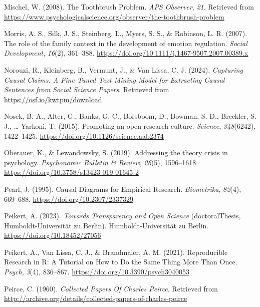 \documentclass[
  man, noextraspace,floatsintext]{apa6}
\newlength{\cslhangindent}
\newenvironment{CSLReferences}[2] %
 {\begin{list}{}{%
  \setlength{\itemindent}{0pt}
  \setlength{\leftmargin}{0pt}
  \setlength{\parsep}{0pt}
  \ifodd #1
   \setlength{\leftmargin}{\cslhangindent}
   \setlength{\itemindent}{-1\cslhangindent}
  \fi
  \setlength{\itemsep}{#2\baselineskip}}}
 {\end{list}}
\begin{document}
\begin{CSLReferences}{1}{0}
Mischel, W. (2008). The {Toothbrush Problem}. \emph{APS Observer}, \emph{21}. Retrieved from \url{https://www.psychologicalscience.org/observer/the-toothbrush-problem}

Morris, A. S., Silk, J. S., Steinberg, L., Myers, S. S., \& Robinson, L. R. (2007). The role of the family context in the development of emotion regulation. \emph{Social Development}, \emph{16}(2), 361--388. \url{https://doi.org/10.1111/j.1467-9507.2007.00389.x}

Norouzi, R., Kleinberg, B., Vermunt, J., \& Van Lissa, C. J. (2024). \emph{Capturing {Causal Claims}: {A Fine Tuned Text Mining Model} for {Extracting Causal Sentences} from {Social Science Papers}}. Retrieved from \url{https://osf.io/kwtpm/download}

Nosek, B. A., Alter, G., Banks, G. C., Borsboom, D., Bowman, S. D., Breckler, S. J., \ldots{} Yarkoni, T. (2015). Promoting an open research culture. \emph{Science}, \emph{348}(6242), 1422--1425. \url{https://doi.org/10.1126/science.aab2374}

Oberauer, K., \& Lewandowsky, S. (2019). Addressing the theory crisis in psychology. \emph{Psychonomic Bulletin \& Review}, \emph{26}(5), 1596--1618. \url{https://doi.org/10.3758/s13423-019-01645-2}

Pearl, J. (1995). Causal {Diagrams} for {Empirical Research}. \emph{Biometrika}, \emph{82}(4), 669--688. \url{https://doi.org/10.2307/2337329}

Peikert, A. (2023). \emph{Towards {Transparency} and {Open Science}} (doctoralThesis, Humboldt-Universität zu Berlin). Humboldt-Universität zu Berlin. \url{https://doi.org/10.18452/27056}

Peikert, A., Van Lissa, C. J., \& Brandmaier, A. M. (2021). Reproducible {Research} in {R}: {A Tutorial} on {How} to {Do} the {Same Thing More Than Once}. \emph{Psych}, \emph{3}(4), 836--867. \url{https://doi.org/10.3390/psych3040053}

Peirce, C. (1960). \emph{Collected {Papers Of Charles Peirce}}. Retrieved from \url{http://archive.org/details/collected-papers-of-charles-peirce}


\end{CSLReferences}
\end{document}
